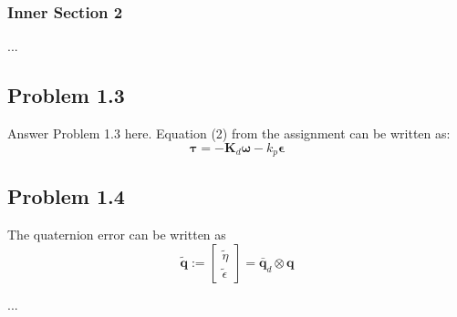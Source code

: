 \subsubsection*{Inner Section 2}
...

\subsection*{Problem 1.3}
Answer Problem 1.3 here. Equation (2) from the assignment can be written as: 
\begin{equation}
  \label{eq:tau}
  \mathbf{\tau} = -\mathbf{K}_d \boldsymbol{\omega} - k_p \boldsymbol{\epsilon}
\end{equation}

\subsection*{Problem 1.4}
The quaternion error can be written as
 \begin{equation}
	 \tilde{\mathbf{q}} := \left[
	 \begin{array}{c}
		 \tilde{\eta} \\
		 \tilde{\epsilon}
	 \end{array}
	 \right] = \bar{\mathbf{q}}_d \otimes \mathbf{q} 
 \end{equation}

...


